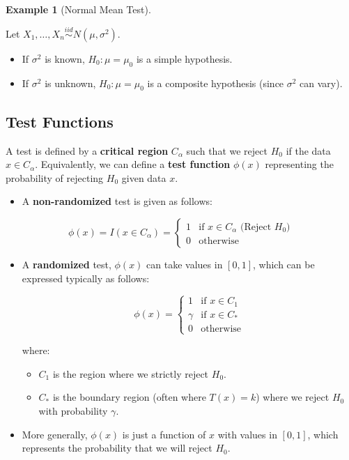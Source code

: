 \documentclass[
  letterpaper,
  DIV=11,
  numbers=noendperiod]{scrreprt}
\providecommand{\tightlist}{%
  \setlength{\itemsep}{0pt}\setlength{\parskip}{0pt}}
\renewcommand{\[}{\begin{equation}}
\renewcommand{\]}{\end{equation}}
\theoremstyle{definition}
\theoremstyle{plain}
\theoremstyle{plain}
\theoremstyle{plain}
\theoremstyle{definition}
\newtheorem{example}{Example}[chapter]
\theoremstyle{plain}
\theoremstyle{remark}
\begin{document}
\begin{example}[Normal Mean
Test]\protect\hypertarget{exm-normal-hypotheses}{}\label{exm-normal-hypotheses}

Let \(X_1, \dots, X_n \overset{iid}{\sim} N(\mu, \sigma^2)\).

\begin{itemize}
\tightlist
\item
  If \(\sigma^2\) is known, \(H_0: \mu = \mu_0\) is a simple hypothesis.
\item
  If \(\sigma^2\) is unknown, \(H_0: \mu = \mu_0\) is a composite
  hypothesis (since \(\sigma^2\) can vary).
\end{itemize}

\end{example}

\subsection{Test Functions}\label{test-functions}

A test is defined by a \textbf{critical region} \(C_\alpha\) such that
we reject \(H_0\) if the data \(x \in C_\alpha\). Equivalently, we can
define a \textbf{test function} \(\phi(x)\) representing the probability
of rejecting \(H_0\) given data \(x\).

\begin{itemize}
\tightlist
\item
  A \textbf{non-randomized} test is given as follows:
\end{itemize}

\[
\phi(x) = I(x \in C_\alpha) = \begin{cases} 1 & \text{if } x \in C_\alpha \text{ (Reject } H_0 \text{)} \\ 0 & \text{otherwise} \end{cases}
\]

\begin{itemize}
\item
  A \textbf{randomized} test, \(\phi(x)\) can take values in \([0, 1]\),
  which can be expressed typically as follows:

  \[
   \phi(x) = \begin{cases} 
   1 & \text{if } x \in C_1 \\
   \gamma & \text{if } x \in C_* \\
   0 & \text{otherwise}
   \end{cases}
   \]

  where:

  \begin{itemize}
  \tightlist
  \item
    \(C_1\) is the region where we strictly reject \(H_0\).
  \item
    \(C_*\) is the boundary region (often where \(T(x) = k\)) where we
    reject \(H_0\) with probability \(\gamma\).
  \end{itemize}
\item
  More generally, \(\phi(x)\) is just a function of \(x\) with values in
  \([0,1]\), which represents the probability that we will reject
  \(H_0\).
\end{itemize}
\end{document}
